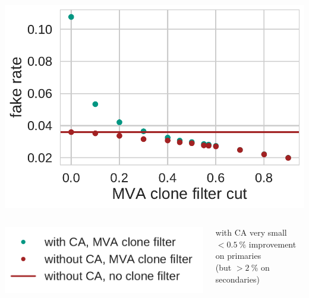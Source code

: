 \documentclass[18pt, aspectratio=169]{beamer}
\begin{document}
\begin{frame}
\begin{columns}
\begin{column}{0.3\textwidth}
      \includegraphics[width=1.0\textwidth]{figures/ca_fake_rate_fullreco_trainedWithFakes.pdf}
    \end{column}
  \end{columns}
  \begin{columns}
    \begin{column}{.4\textwidth}
      \includegraphics[width=.7\textwidth]{figures/legend_ca_fom_fullreco.pdf}
    \end{column}
    \begin{column}{.6\textwidth}
      with CA very small $< \SI{0.5}{\percent}$ improvement on primaries\\(but $> \SI{2}{\percent}$ on secondaries)
    \end{column}
  \end{columns}
\end{frame}
\end{document}
